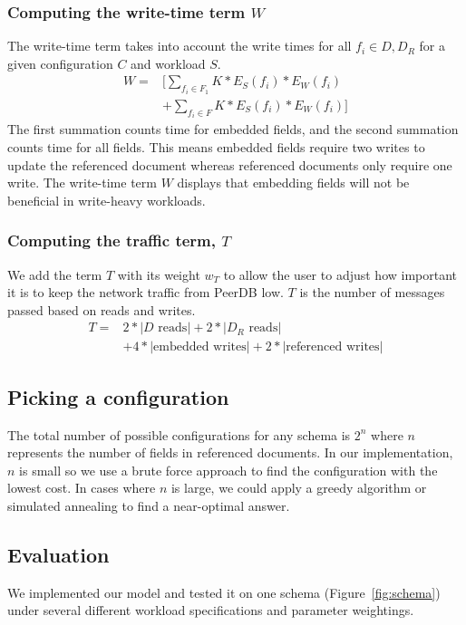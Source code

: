 \subsubsection{Computing the write-time term $W$}
The write-time term takes into account the write times for all $f_i \in D, D_R$ for a given configuration $C$ and workload $S$. 
\begin{align*}
W =& [\sum_{f_i \in F_1} K*E_S(f_i)*E_W(f_i)\\
& + \sum_{f_i \in F} K*E_S(f_i)*E_W(f_i)]
\end{align*}
The first summation counts time for embedded fields, and the second summation counts time for all fields. This means embedded fields require two writes to update the referenced document whereas referenced documents only require one write. 
The write-time term $W$ displays that embedding fields will not be beneficial in write-heavy workloads.

\subsubsection{Computing the traffic term, $T$}
We add the term $T$ with its weight $w_T$ to allow the user to adjust how important it is to keep the network traffic from PeerDB low. 
$T$ is the number of messages passed based on reads and writes. 
\begin{align*}
T=& 2*|D\text{ reads}| + 2*|D_R\text{ reads}|\\
& + 4*|\text{embedded writes}| + 2*|\text{referenced writes}| 
\end{align*}

\subsection{Picking a configuration}
The total number of possible configurations for any schema is $2^n$ where $n$ represents the number of fields in referenced documents. 
In our implementation, $n$ is small so we use a brute force approach to find the configuration with the lowest cost. 
In cases where $n$ is large, we could apply a greedy algorithm or simulated annealing to find a near-optimal answer.

\subsection{Evaluation}
We implemented our model and tested it on one schema (Figure~\ref{fig:schema}) under several different workload specifications and parameter weightings. 


